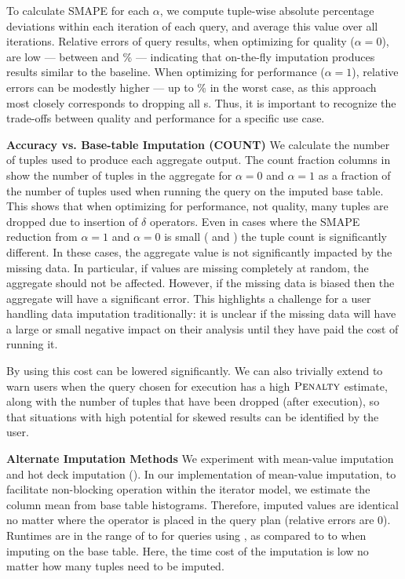 {To calculate SMAPE for each $\alpha$,
we compute tuple-wise absolute percentage deviations within each iteration of each query, and
average this value over all iterations.
Relative errors of query results, when optimizing for quality
($\alpha=0$), are low --- between \lowsmapealphazero{} and
\highsmapealphazero{}\% --- indicating that on-the-fly imputation produces
results similar to the baseline. When optimizing for performance ($\alpha=1$),
relative errors can be modestly higher --- up to \highsmapealphaone{}\% in the
worst case, as this approach most closely corresponds to dropping all
\nullv{}s. Thus, it is important to recognize the trade-offs between quality and
performance for a specific use case.

\textbf{Accuracy vs. Base-table Imputation (COUNT)}\quad
We calculate the number of tuples used to produce each aggregate output.
The count fraction columns in  show the number of tuples in the aggregate for $\alpha = 0$ and $\alpha = 1$ as a fraction of the number of tuples used when running the query on the imputed base table.
This shows that when optimizing for performance, not quality, many tuples are dropped due to
insertion of $\delta$ operators.
Even in cases where the SMAPE reduction from $\alpha = 1$ and $\alpha = 0$ is small
( and ) the tuple count is significantly different.
In these cases, the aggregate value is not significantly impacted by the missing data. In
particular, if values are missing completely at random,
the aggregate should not be affected.
However, if the missing data is biased then the aggregate will have a significant error.
This highlights a challenge for a user handling data imputation traditionally: it is unclear if the missing data will have a large or small negative impact on their analysis until they have paid the cost of running it.

By using \ProjectName{} this cost can be lowered significantly. We can also trivially extend \ProjectName{} to warn users when the query chosen for execution has a high
$\textsc{Penalty}$ estimate, along with the number of tuples that have been dropped (after execution), so that situations with high potential for skewed results can be identified by the user.

\textbf{Alternate Imputation Methods}\quad
We experiment with mean-value imputation and hot deck imputation
(). In our implementation of mean-value imputation, to facilitate
non-blocking operation within the iterator model, we estimate the column mean from base
table histograms. Therefore, imputed values are identical no matter where the operator is
placed in the query plan (relative errors are $0$). Runtimes are in the range of
\runtimemeanlow{} to \runtimemeanhigh{} for queries using \ProjectName{}, as compared to
\runtimemeanlowbase{} to \runtimemeanhighbase{} when imputing on the base table.  Here, the
time cost of the imputation is low no matter how many tuples need to be imputed.  

}
